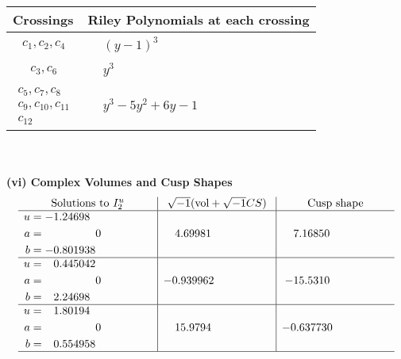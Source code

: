 \documentclass[1p]{elsarticle_modified}
\theoremstyle{definition}
\newcommand{\I}{\sqrt{-1}}
\begin{document}
\begin{tabular}{m{50pt}|m{274pt}}
Crossings & \hspace{64pt}Riley Polynomials at each crossing \\
\hline $$\begin{aligned}c_{1},c_{2},c_{4}\end{aligned}$$&$\begin{aligned}
&(y-1)^3
\end{aligned}$\\
\hline $$\begin{aligned}c_{3},c_{6}\end{aligned}$$&$\begin{aligned}
&y^3
\end{aligned}$\\
\hline $$\begin{aligned}c_{5},c_{7},c_{8}\\c_{9},c_{10},c_{11}\\c_{12}\end{aligned}$$&$\begin{aligned}
&y^3-5 y^2+6 y-1
\end{aligned}$\\
\hline
\end{tabular}\\~\\
\newpage\flushleft \textbf{(vi) Complex Volumes and Cusp Shapes}
$$\begin{array}{c|c|c}  
\text{Solutions to }I^u_{2}& \I (\text{vol} + \sqrt{-1}CS) & \text{Cusp shape}\\
 \hline 
\begin{aligned}
u &= -1.24698\phantom{ +0.000000I} \\
a &= \phantom{-0.000000 } 0 \\
b &= -0.801938\phantom{ +0.000000I}\end{aligned}
 & \phantom{-}4.69981\phantom{ +0.000000I} & \phantom{-}7.16850\phantom{ +0.000000I} \\ \hline\begin{aligned}
u &= \phantom{-}0.445042\phantom{ +0.000000I} \\
a &= \phantom{-0.000000 } 0 \\
b &= \phantom{-}2.24698\phantom{ +0.000000I}\end{aligned}
 & -0.939962\phantom{ +0.000000I} & -15.5310\phantom{ +0.000000I} \\ \hline\begin{aligned}
u &= \phantom{-}1.80194\phantom{ +0.000000I} \\
a &= \phantom{-0.000000 } 0 \\
b &= \phantom{-}0.554958\phantom{ +0.000000I}\end{aligned}
 & \phantom{-}15.9794\phantom{ +0.000000I} & -0.637730\phantom{ +0.000000I}\\
 \hline 
 \end{array}$$\newpage
\end{document}
